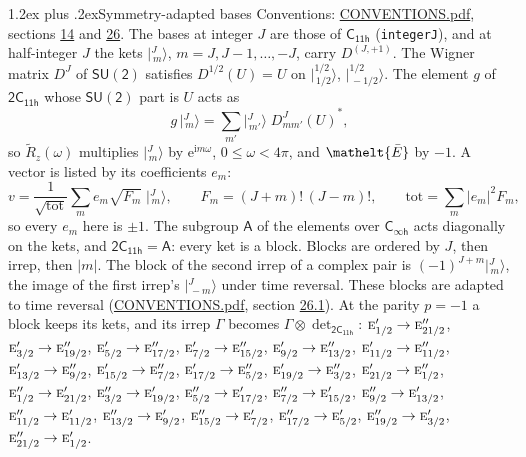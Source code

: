 \documentclass[10pt,a4paper]{article}
\makeatletter
\renewcommand\section{\@startsection{section}{1}{\z@}{-3ex plus -1ex minus -.2ex}%
  {1.2ex plus .2ex}{\normalfont\large\sffamily\bfseries\color{parttitle}}}
\numberwithin{equation}{section}
\newcommand{\eltfont}[1]{{\let\sigma\eltsigma\mathelt{#1}}}
\newcommand{\grp}[1]{\mathsf{#1}}
\newcommand{\irr}[1]{\text{\normalfont\scshape #1}}
\newcommand{\elt}[1]{\eltfont{#1}}
\newcommand{\iunit}{\mathrm{i}}
\newcommand{\expe}{\mathrm{e}}
\newcommand{\irrJp}[2]{D^{(#1,#2)}}
\newcommand{\wignerD}[1]{D^{#1}}
\newcommand{\conj}[1]{{#1}^{*}}
\newcommand{\irrprod}{\otimes}
\newcommand{\jm}[2]{\bigl\lvert{}^{#1}_{\,#2}\bigr\rangle}
\newcommand{\barred}[1]{\bar{#1}}
\newcommand{\lift}[1]{\tilde{#1}}
\makeatother
\begin{document}
\section{Symmetry-adapted bases}\label{s:bases}
Conventions: \href{../../CONVENTIONS.pdf}{CONVENTIONS.pdf}, sections \href{../../../rotation/CONVENTIONS.pdf\#conv.14}{14} and \href{../../CONVENTIONS.pdf\#conv.26}{26}.
\leavevmode\label{n:index.m}\label{n:vector.ket}The bases at integer $J$ are those of \href{../../../rotation/data/pdf/C11h.pdf}{$\grp{C_{11h}}$} (\texttt{integerJ}), and at half-integer $J$ the kets $\jm{J}{m}$, $m = J, J-1, \dots, -J$, carry $\irrJp{J}{+1}$. \label{n:matrix.wigner}The Wigner matrix $\wignerD{J}$ of $\grp{SU(2)}$ satisfies $\wignerD{1/2}(U) = U$ on $\jm{1/2}{1/2}$, $\jm{1/2}{-1/2}$. The element $g$ of $\grp{2C_{11h}}$ whose $\grp{SU(2)}$ part is $U$ acts as
\begin{equation}\label{e:action}g\,\jm{J}{m} = \sum_{m'} \jm{J}{m'}\; \conj{\wignerD{J}_{m m'}(U)},\end{equation}
so $\lift{R}_{z}(\omega)$ multiplies $\jm{J}{m}$ by $\expe^{\iunit m\omega}$, $0 \le \omega < 4\pi$, and $\elt{\barred{E}}$ by $-1$. \label{n:index.ketcoefficient}\label{n:vector.basis.symmetry}\label{n:index.ketweight}\label{n:index.total}A vector is listed by its coefficients $e_m$:
\begin{equation}\label{e:ket}v = \frac{1}{\sqrt{\mathrm{tot}}}\sum_m e_m\sqrt{F_m}\;\jm{J}{m},\qquad F_m = (J+m)!\,(J-m)!,\qquad \mathrm{tot} = \sum_m |e_m|^2F_m,\end{equation}
so every $e_m$ here is $\pm 1$.
\leavevmode\label{n:group.A}The subgroup $\grp{A}$ of the elements over $\grp{C_{\infty h}}$ acts diagonally on the kets, and $\grp{2C_{11h}} = \grp{A}$: every ket is a block. Blocks are ordered by $J$, then irrep, then $|m|$. The block of the second irrep of a complex pair is $(-1)^{J+m}\jm{J}{m}$, the image of the first irrep's $\jm{J}{-m}$ under time reversal. These blocks are adapted to time reversal (\href{../../CONVENTIONS.pdf}{CONVENTIONS.pdf}, section \href{../../CONVENTIONS.pdf\#conv.26.1}{26.1}).
At the parity $p = -1$ a block keeps its kets, and its irrep $\Gamma$ becomes $\Gamma \irrprod \det_{\grp{2C_{11h}}}$: $\irr{e}_{1/2}' \to \irr{e}_{21/2}''$, $\irr{e}_{3/2}' \to \irr{e}_{19/2}''$, $\irr{e}_{5/2}' \to \irr{e}_{17/2}''$, $\irr{e}_{7/2}' \to \irr{e}_{15/2}''$, $\irr{e}_{9/2}' \to \irr{e}_{13/2}''$, $\irr{e}_{11/2}' \to \irr{e}_{11/2}''$, $\irr{e}_{13/2}' \to \irr{e}_{9/2}''$, $\irr{e}_{15/2}' \to \irr{e}_{7/2}''$, $\irr{e}_{17/2}' \to \irr{e}_{5/2}''$, $\irr{e}_{19/2}' \to \irr{e}_{3/2}''$, $\irr{e}_{21/2}' \to \irr{e}_{1/2}''$, $\irr{e}_{1/2}'' \to \irr{e}_{21/2}'$, $\irr{e}_{3/2}'' \to \irr{e}_{19/2}'$, $\irr{e}_{5/2}'' \to \irr{e}_{17/2}'$, $\irr{e}_{7/2}'' \to \irr{e}_{15/2}'$, $\irr{e}_{9/2}'' \to \irr{e}_{13/2}'$, $\irr{e}_{11/2}'' \to \irr{e}_{11/2}'$, $\irr{e}_{13/2}'' \to \irr{e}_{9/2}'$, $\irr{e}_{15/2}'' \to \irr{e}_{7/2}'$, $\irr{e}_{17/2}'' \to \irr{e}_{5/2}'$, $\irr{e}_{19/2}'' \to \irr{e}_{3/2}'$, $\irr{e}_{21/2}'' \to \irr{e}_{1/2}'$.
\end{document}
